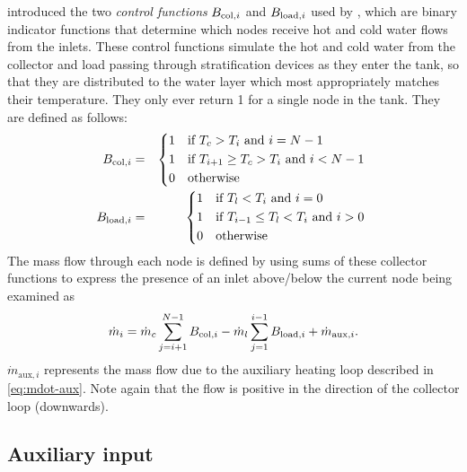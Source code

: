  introduced the two \emph{control functions} $B_{\text{col}, i}$ and $B_{\text{load}, i}$ used by , which are binary indicator functions that determine which nodes receive hot and cold water flows from the inlets.
These control functions simulate the hot and cold water from the collector and load passing through stratification devices as they enter the tank, so that they are distributed to the water layer which most appropriately matches their temperature.
They only ever return 1 for a single node in the tank.
They are defined as follows:
\begin{eqnarray}
   \label{eq:B-col}
   \B{col} &=& \begin{dcases*}
      1 & if $T_c > T_i$ and $i = N-1$ \\
      1 & if $T_{i+1} \ge T_c > T_i$ and $i < N-1$ \\
      0 & otherwise
   \end{dcases*}
   \\
   \label{eq:B-load}
   \B{load} &=& \begin{dcases*}
      1 & if $T_l < T_i$ and $i = 0$ \\
      1 & if $T_{i-1} \le T_l < T_i$ and $i > 0$ \\
      0 & otherwise
   \end{dcases*}
\end{eqnarray}
The mass flow through each node is defined by  using sums of these collector functions to express the presence of an inlet above/below the current node being examined as
\begin{equation}
	\label{eq:mdot}
   \dot{m}_i = \dot{m}_c \sum_{j=i+1}^{N-1} B_{\text{col}, i}
             - \dot{m}_l \sum_{j=1}^{i-1} B_{\text{load}, i}
             + \dot{m}_{\text{aux}, i}.
\end{equation}
$\dot{m}_{\text{aux}, i}$ represents the mass flow due to the auxiliary heating loop described in \autoref{eq:mdot-aux}.
Note again that the flow is positive in the direction of the collector loop (downwards).

\subsection{Auxiliary input}


